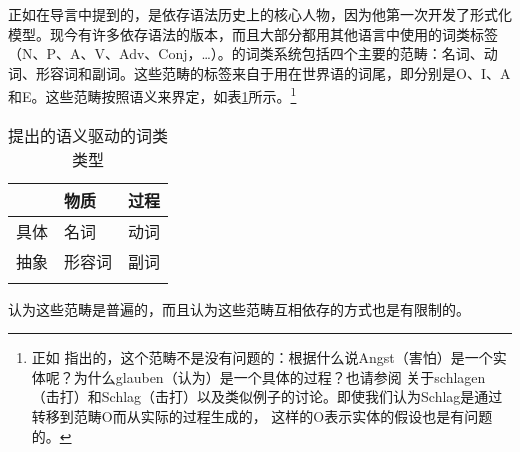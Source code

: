 正如在导言中提到的，\tes 是依存语法历史上的核心人物，因为他第一次开发了形式化模型\citep{Tesniere59a-u,Tesniere80a-u,Tesniere2015a-not-crossreferenced}。现今有许多依存语法的版本，而且大部分都用其他语言中使用的词类标签（N、P、A、V、Adv、Conj，\ldots）。\tes 的词类系统包括四个主要的范畴：名词、动词、形容词和副词。这些范畴的标签来自于用在世界语的词尾，即分别是O、I、A和E。这些范畴按照语义来界定，如表\ref{table-pos-tesniere}所示。\footnote{%
正如 \citet[]{Weber97a}指出的，这个范畴不是没有问题的：根据什么说Angst（害怕）是一个实体呢？为什么glauben（认为）是一个具体的过程？也请参阅 \citet[\S~3.4]{Klein71a-u}关于schlagen（击打）和Schlag（击打）以及类似例子的讨论。即使我们认为Schlag是通过转移到范畴O而从实际的过程生成的， 这样的O表示实体的假设也是有问题的。
}
\begin{table}
\begin{tabular}{lll}
\lsptoprule
         & 物质 & 过程\\
\midrule
具体 & 名词 & 动词 \\
抽象 & 形容词 & 副词\\
\lspbottomrule
\end{tabular}
\caption{\label{table-pos-tesniere}\tes 提出的语义驱动的词类类型}
\end{table}%
\tes 认为这些范畴是普遍的，而且认为这些范畴互相依存的方式也是有限制的。

